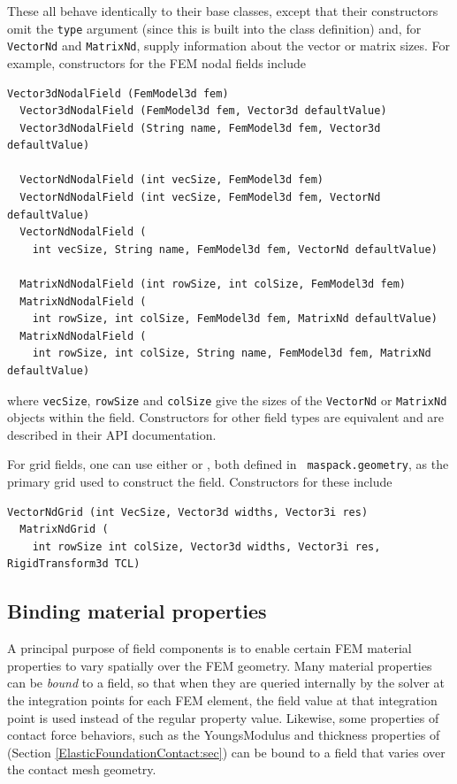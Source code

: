 %
These all behave identically to their base classes,
except that their constructors omit the {\tt type} argument (since
this is built into the class definition) and, for {\tt VectorNd} and
{\tt MatrixNd}, supply information about the vector or matrix sizes.
For example, constructors for the FEM nodal fields include
%
\begin{lstlisting}[]
  Vector3dNodalField (FemModel3d fem)
  Vector3dNodalField (FemModel3d fem, Vector3d defaultValue)
  Vector3dNodalField (String name, FemModel3d fem, Vector3d defaultValue)

  VectorNdNodalField (int vecSize, FemModel3d fem)
  VectorNdNodalField (int vecSize, FemModel3d fem, VectorNd defaultValue)
  VectorNdNodalField (
    int vecSize, String name, FemModel3d fem, VectorNd defaultValue)

  MatrixNdNodalField (int rowSize, int colSize, FemModel3d fem)
  MatrixNdNodalField (
    int rowSize, int colSize, FemModel3d fem, MatrixNd defaultValue)
  MatrixNdNodalField (
    int rowSize, int colSize, String name, FemModel3d fem, MatrixNd defaultValue)
\end{lstlisting}
%
where {\tt vecSize}, {\tt rowSize} and {\tt colSize} give the sizes of
the {\tt VectorNd} or {\tt MatrixNd} objects within the
field. Constructors for other field types are equivalent and are described
in their API documentation.

For grid fields, one can use either
 or
, both defined in {\tt
maspack.geometry}, as the primary grid used to construct the
field. Constructors for these include
%
\begin{lstlisting}[]
  VectorNdGrid (int VecSize, Vector3d widths, Vector3i res)
  MatrixNdGrid (
    int rowSize int colSize, Vector3d widths, Vector3i res, RigidTransform3d TCL)
\end{lstlisting}
%

\subsection{Binding material properties}
\label{sec:fieldBinding}

A principal purpose of field components is to enable certain FEM
material properties to vary spatially over the FEM geometry.  Many
material properties can be {\it bound} to a field, so that when they
are queried internally by the solver at the integration points for
each FEM element, the field value at that integration point is used
instead of the regular property value. Likewise, some
properties of contact force behaviors, such as
the {\sf YoungsModulus} and {\sf thickness} properties of
(Section \ref{ElasticFoundationContact:sec}) can be bound to a field
that varies over the contact mesh geometry.

